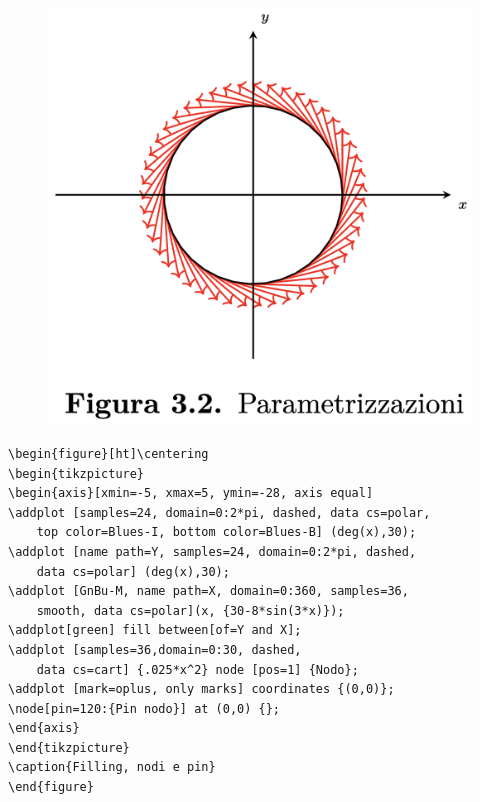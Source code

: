 \begin{figure}[ht]\centering
\includegraphics[scale=.4]{FileAusiliari/Screenshots/Figura3-2.png}
\end{figure}

\newpage

\begin{verbatim}
\begin{figure}[ht]\centering
\begin{tikzpicture}
\begin{axis}[xmin=-5, xmax=5, ymin=-28, axis equal]
\addplot [samples=24, domain=0:2*pi, dashed, data cs=polar,
	top color=Blues-I, bottom color=Blues-B] (deg(x),30);
\addplot [name path=Y, samples=24, domain=0:2*pi, dashed,
    data cs=polar] (deg(x),30);
\addplot [GnBu-M, name path=X, domain=0:360, samples=36,
    smooth, data cs=polar](x, {30-8*sin(3*x)});
\addplot[green] fill between[of=Y and X];
\addplot [samples=36,domain=0:30, dashed,
    data cs=cart] {.025*x^2} node [pos=1] {Nodo};
\addplot [mark=oplus, only marks] coordinates {(0,0)};
\node[pin=120:{Pin nodo}] at (0,0) {};
\end{axis}
\end{tikzpicture}
\caption{Filling, nodi e pin}
\end{figure}	
\end{verbatim}

